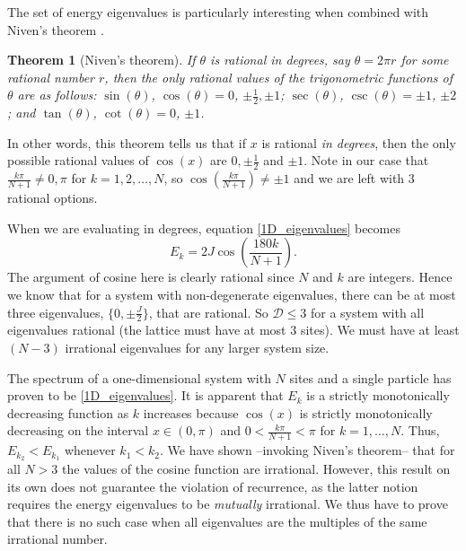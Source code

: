 \documentclass[a4paper, 10pt]{article}
\theoremstyle{plain}
\newtheorem*{theorem*}{Theorem}
\begin{document}
The set of energy eigenvalues is particularly interesting when combined with
Niven's theorem \cite{DoubleIvan}.

\begin{theorem*}[Niven's theorem]
    If $\theta$ is rational in degrees, say $\theta=2\pi r$ for some rational
    number $r$, then the only rational values of the trigonometric functions of
    $\theta$ are as follows: $\sin{\!(\theta)}$, $\cos{\!(\theta)} = 0$, $\pm
    \frac{1}{2}, \pm 1$; $\sec{\!(\theta)}$, $\csc{\!(\theta)} = \pm 1$, $\pm 2$;
    and $\tan{\!(\theta)}$, $\cot{\!(\theta)} = 0$, $\pm 1$.
\end{theorem*}
In other words, this theorem tells us that if $x$ is rational \textit{in
degrees}, then the only possible rational values of $\cos(x)$ are $0, \pm
\frac{1}{2}$ and $\pm 1$. Note in our case that $\frac{k\pi}{N+1}\neq 0, \pi$
for $k=1, 2, \dots, N$, so $\cos{\!(\frac{k\pi}{N+1})} \neq \pm 1$ and we are
left with $3$ rational options.

When we are evaluating in degrees, equation \eqref{1D_eigenvalues} becomes
\begin{equation}
    E_{k} = 2 J \cos{\!\left ( \frac{180k}{N+1} \right )}.
\end{equation}
The argument of cosine here is clearly rational since $N$ and $k$ are integers.
Hence we know that for a system with non-degenerate eigenvalues, there can be at
most three eigenvalues, $\lbrace 0, \pm \frac{J}{2} \rbrace$, that are rational.
So $\mathcal{D} \leq 3$ for a system with all eigenvalues rational (the lattice
must have at most 3 sites). We must have at least $(N-3)$ irrational eigenvalues
for any larger system size.

The spectrum of a one-dimensional system with $N$ sites and a single particle
has proven to be \eqref{1D_eigenvalues}. It is apparent that $E_{k}$ is a
strictly monotonically decreasing function as $k$ increases because $\cos(x)$ is
strictly monotonically decreasing on the interval $x\in(0,\pi)$ and $0 <
\frac{k\pi}{N+1} < \pi$ for $k=1,\dots,N$. Thus, $E_{k_{2}} < E_{k_{1}}$
whenever $k_{1} < k_{2}$. We have shown --invoking Niven's theorem-- that for
all $N>3$ the values of the cosine function are irrational. However, this result
on its own does not guarantee the violation of recurrence, as the latter notion
requires the energy eigenvalues to be {\emph{mutually}} irrational. We thus have
to prove that there is no such case when all eigenvalues are the multiples of
the same irrational number.
\end{document}
